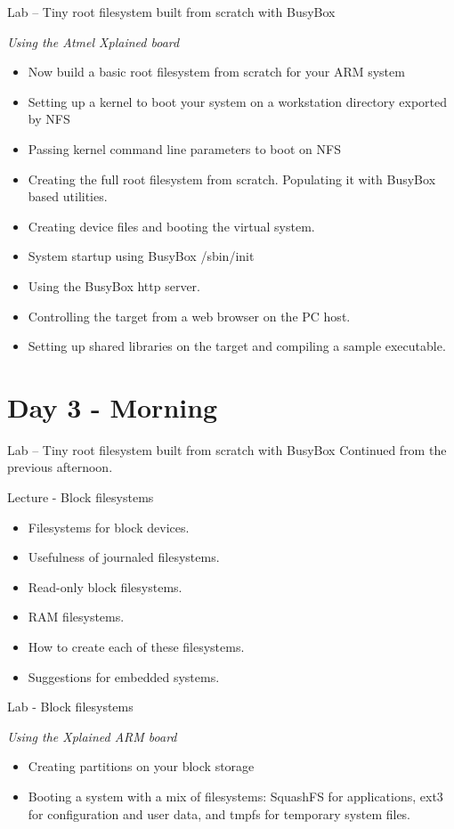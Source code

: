 \documentclass[a4paper,12pt,obeyspaces,spaces,hyphens]{article}
\begin{document}
\feagendaonecolumn
{Lab – Tiny root filesystem built from scratch with BusyBox}
{
  {\em Using the Atmel Xplained board}
  \begin{itemize}
  \item Now build a basic root filesystem from scratch for your ARM system
  \item Setting up a kernel to boot your system on a workstation
        directory exported by NFS
  \item Passing kernel command line parameters to boot on NFS
  \item Creating the full root filesystem from scratch.
        Populating it with BusyBox based utilities.
  \item Creating device files and booting the virtual system.
  \item System startup using BusyBox /sbin/init
  \item Using the BusyBox http server.
  \item Controlling the target from a web browser on the PC host.
  \item Setting up shared libraries on the target and compiling
        a sample executable.
  \end{itemize}
}

\section{Day 3 - Morning}

\feagendaonecolumn
{Lab – Tiny root filesystem built from scratch with BusyBox}
{
   Continued from the previous afternoon.
}

\feagendatwocolumn
{Lecture - Block filesystems}
{
  \begin{itemize}
  \item Filesystems for block devices.
  \item Usefulness of journaled filesystems.
  \item Read-only block filesystems.
  \item RAM filesystems.
  \item How to create each of these filesystems.
  \item Suggestions for embedded systems.
  \end{itemize}
}
{Lab - Block filesystems}
{
  {\em Using the Xplained ARM board}
  \begin{itemize}
  \item Creating partitions on your block storage
  \item Booting a system with a mix of filesystems: SquashFS for
	applications, ext3 for configuration and user data, and
	tmpfs for temporary system files.
  \end{itemize}
}
\end{document}

